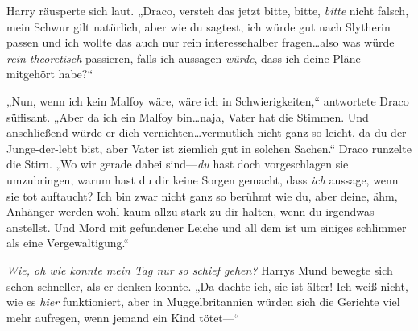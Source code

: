 Harry räusperte sich laut. „Draco, versteh das jetzt bitte, bitte, \emph{bitte} nicht falsch, mein Schwur gilt natürlich, aber wie du sagtest, ich würde gut nach Slytherin passen und ich wollte das auch nur rein interessehalber fragen…also was würde \emph{rein theoretisch} passieren, falls ich aussagen \emph{würde}, dass ich deine Pläne mitgehört habe?“

„Nun, wenn ich kein Malfoy wäre, wäre ich in Schwierigkeiten,“ antwortete Draco süffisant. „Aber da ich ein Malfoy bin…naja, Vater hat die Stimmen. Und anschließend würde er dich vernichten…vermutlich nicht ganz so leicht, da du der Junge-der-lebt bist, aber Vater ist ziemlich gut in solchen Sachen.“ Draco runzelte die Stirn. „Wo wir gerade dabei sind—\emph{du} hast doch vorgeschlagen sie umzubringen, warum hast du dir keine Sorgen gemacht, dass \emph{ich} aussage, wenn sie tot auftaucht? Ich bin zwar nicht ganz so berühmt wie du, aber deine, ähm, Anhänger werden wohl kaum allzu stark zu dir halten, wenn du irgendwas anstellst. Und Mord mit gefundener Leiche und all dem ist um einiges schlimmer als eine Vergewaltigung.“

\emph{Wie, oh wie konnte mein Tag nur so schief gehen?} Harrys Mund bewegte sich schon schneller, als er denken konnte. „Da dachte ich, sie ist älter! Ich weiß nicht, wie es \emph{hier} funktioniert, aber in Muggelbritannien würden sich die Gerichte viel mehr aufregen, wenn jemand ein Kind tötet—“

